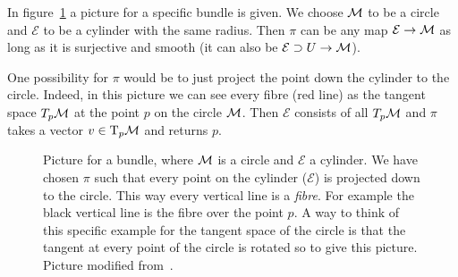 \documentclass[11pt, a4paper, twocolumn]{article} %
\begin{document}
\begin{note}
In figure~\ref{fig:circletangentbundle} a picture for a specific bundle is given.
We choose $\mathcal{M}$ to be a circle and $\mathcal{E}$ to be a cylinder with the same radius.
Then $\pi$ can be any map $\mathcal{E}\to\mathcal{M}$ as long as it is surjective and smooth (it can also be $\mathcal{E}\supset U \to \mathcal{M}$).

One possibility for $\pi$ would be to just project the point down the cylinder to the circle.
Indeed, in this picture we can see every fibre (red line) as the tangent space $T_p\mathcal{M}$ at the point
$p$ on the circle $\mathcal{M}$. Then $\mathcal{E}$ consists of all $T_p\mathcal{M}$ and $\pi$ takes a vector $v\in \T_p\M$
and returns $p$.
\end{note}


\begin{figure}[tbh]
    \centering
    \caption{Picture for a bundle, where $\mathcal{M}$ is a circle and $\mathcal{E}$ a cylinder.
        We have chosen $\pi$ such that every point on the cylinder ($\mathcal{E}$) is projected
        down to the circle. This way every vertical line is a \textit{fibre}.
        For example the black vertical line is the fibre over the point $p$. 
        A way to think of this specific example for the tangent space of the
        circle is that the tangent at every point of the circle is rotated so
        to give this picture. 
        Picture modified from~\cite{texstackexchange:tangentbundlecircle}.}
    \label{fig:circletangentbundle}
\end{figure}
\end{document}
